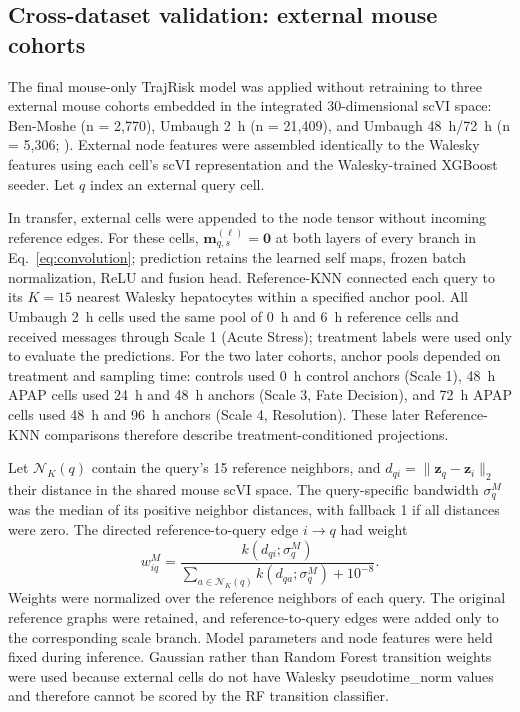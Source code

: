 \subsection*{Cross-dataset validation: external mouse cohorts}

The final mouse-only TrajRisk model was applied without retraining to three external mouse cohorts embedded in the integrated 30-dimensional scVI space: Ben-Moshe (n = 2,770), Umbaugh 2~h (n = 21,409), and Umbaugh 48~h/72~h (n = 5,306; ). External node features were assembled identically to the Walesky features using each cell's scVI representation and the Walesky-trained XGBoost seeder. Let \(q\) index an external query cell.

In \SelfOnly{} transfer, external cells were appended to the node tensor without incoming reference edges. For these cells, \(\boldsymbol m_{q,s}^{(\ell)}=\boldsymbol0\) at both layers of every branch in Eq.~\eqref{eq:convolution}; prediction retains the learned self maps, frozen batch normalization, ReLU and fusion head. Reference-KNN connected each query to its \(K=15\) nearest Walesky hepatocytes within a specified anchor pool. All Umbaugh 2~h cells used the same pool of 0~h and 6~h reference cells and received messages through Scale 1 (Acute Stress); treatment labels were used only to evaluate the predictions. For the two later cohorts, anchor pools depended on treatment and sampling time: controls used 0~h control anchors (Scale 1), 48~h APAP cells used 24~h and 48~h anchors (Scale 3, Fate Decision), and 72~h APAP cells used 48~h and 96~h anchors (Scale 4, Resolution). These later Reference-KNN comparisons therefore describe treatment-conditioned projections.

Let \(\mathcal N_K(q)\) contain the query's 15 reference neighbors, and \(d_{qi}=\|\boldsymbol z_q-\boldsymbol z_i\|_2\) their distance in the shared mouse scVI space. The query-specific bandwidth \(\sigma_q^{M}\) was the median of its positive neighbor distances, with fallback 1 if all distances were zero. The directed reference-to-query edge \(i\to q\) had weight
\begin{equation}\label{eq:mouse-transfer}
w_{iq}^{M}=\frac{k(d_{qi};\sigma_q^{M})}
{\sum_{a\in\mathcal N_K(q)}k(d_{qa};\sigma_q^{M})+10^{-8}}.
\end{equation}
Weights were normalized over the reference neighbors of each query. The original reference graphs were retained, and reference-to-query edges were added only to the corresponding scale branch. Model parameters and node features were held fixed during inference. Gaussian rather than Random Forest transition weights were used because external cells do not have Walesky pseudotime\_norm values and therefore cannot be scored by the RF transition classifier.

